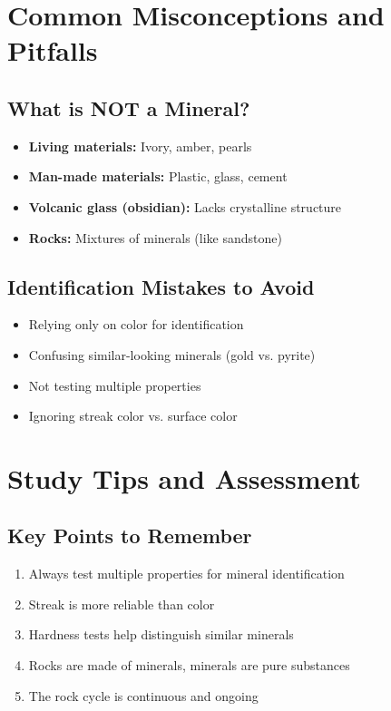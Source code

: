 \documentclass{article}
\begin{document}
\section{Common Misconceptions and Pitfalls}

\subsection{What is NOT a Mineral?}
\begin{itemize}
    \item \textbf{Living materials:} Ivory, amber, pearls
    \item \textbf{Man-made materials:} Plastic, glass, cement
    \item \textbf{Volcanic glass (obsidian):} Lacks crystalline structure
    \item \textbf{Rocks:} Mixtures of minerals (like sandstone)
\end{itemize}

\subsection{Identification Mistakes to Avoid}
\begin{itemize}
    \item Relying only on color for identification
    \item Confusing similar-looking minerals (gold vs. pyrite)
    \item Not testing multiple properties
    \item Ignoring streak color vs. surface color
\end{itemize}

\section{Study Tips and Assessment}

\subsection{Key Points to Remember}
\begin{enumerate}
    \item Always test multiple properties for mineral identification
    \item Streak is more reliable than color
    \item Hardness tests help distinguish similar minerals
    \item Rocks are made of minerals, minerals are pure substances
    \item The rock cycle is continuous and ongoing
\end{enumerate}
 
\end{document}
